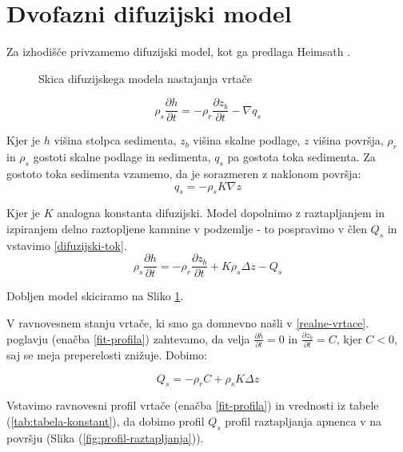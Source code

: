 \documentclass[a4paper, oneside, 12pt]{book}
\begin{document}
\newpage

\section{Dvofazni difuzijski model}

Za izhodišče privzamemo difuzijski model, kot ga predlaga Heimsath \cite{Heimsath2001}.

\begin{figure}[H]
  \centering
  
  \caption{Skica difuzijskega modela nastajanja vrtače}
  \label{fig:difuzijski-model}
\end{figure}

\begin{equation}
  \rho_s \frac{\partial h}{\partial t} = -\rho_r \frac{\partial z_b}{\partial t} - \nabla q_s
  \label{kontinuitetna-enacba-original}
\end{equation}

Kjer je $h$ višina stolpca sedimenta, $z_b$ višina skalne podlage, $z$ višina površja, $\rho_r$ in $\rho_s$ gostoti skalne podlage in sedimenta, $q_s$ pa gostota toka sedimenta. Za gostoto toka sedimenta vzamemo, da je sorazmeren z naklonom površja:
\begin{equation}
  q_s = - \rho_s K \nabla z
  \label{difuzijski-tok}
\end{equation}

Kjer je $K$ analogna konstanta difuzijski.
Model dopolnimo z raztapljanjem in izpiranjem delno raztopljene kamnine v podzemlje - to pospravimo v člen $Q_s$ in vstavimo \ref{difuzijski-tok}.
\begin{equation}
  \rho_s \frac{\partial h}{\partial t} = -\rho_r \frac{\partial z_b}{\partial t} + K \rho_s \Delta z - Q_s
  \label{kontinuitetna-enacba}
\end{equation}

Dobljen model skiciramo na Sliko \ref{fig:difuzijski-model}.

V ravnovesnem stanju vrtače, ki smo ga domnevno našli v \ref{realne-vrtace}. poglavju (enačba \ref{fit-profila}) zahtevamo, da velja $\frac{\partial h}{\partial t} = 0$ in $\frac{\partial z_b}{\partial t} = C$, kjer $C<0$, saj se meja preperelosti znižuje. Dobimo:

\begin{equation}
  Q_s = - \rho_r C + \rho_s K \Delta z
  \label{kontinuitetna-enacba-ravnovesje}
\end{equation}

Vstavimo ravnovesni profil vrtače (enačba \ref{fit-profila}) in vrednosti iz tabele (\ref{tab:tabela-konstant}), da dobimo profil $Q_s$ profil raztapljanja apnenca v na površju (Slika (\ref{fig:profil-raztapljanja})).
\end{document}
